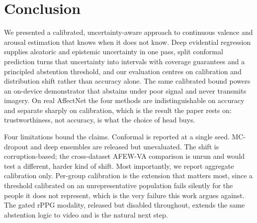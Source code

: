 \section{Conclusion}

We presented a calibrated, uncertainty-aware approach to continuous valence and
arousal estimation that knows when it does not know. Deep evidential regression
supplies aleatoric and epistemic uncertainty in one pass, split conformal
prediction turns that uncertainty into intervals with coverage guarantees and a
principled abstention threshold, and our evaluation centres on calibration and
distribution shift rather than accuracy alone. The same calibrated bound powers
an on-device demonstrator that abstains under poor signal and never transmits
imagery. On real AffectNet the four methods are indistinguishable on accuracy and
separate sharply on calibration, which is the result the paper rests on:
trustworthiness, not accuracy, is what the choice of head buys.

Four limitations bound the claims. Conformal is reported at a single seed.
MC-dropout and deep ensembles are released but unevaluated. The shift is
corruption-based; the cross-dataset AFEW-VA comparison is unrun and would test a
different, harder kind of shift. Most importantly, we report aggregate
calibration only. Per-group calibration is the extension that matters most,
since a threshold calibrated on an unrepresentative population fails silently for
the people it does not represent, which is the very failure this work argues
against. The gated rPPG modality, released but disabled throughout, extends the
same abstention logic to video and is the natural next step.
